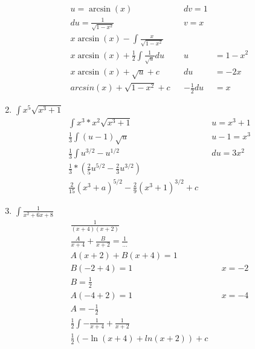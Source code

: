 \documentclass[11pt]{article}
\begin{document}
\begin{enumerate}
        \begin{align*}
            \label{q:6}
            u = \arcsin(x) && dv = 1 \\
            du = \frac{1}{\sqrt{1 - x^2}} && v = x \\
            x\arcsin(x) - \int \frac{x}{\sqrt{1 - x^2}} \\
            x\arcsin(x) + \frac{1}{2}\int\frac{1}{\sqrt{u}}du && u &= 1 - x^2 \\
            x\arcsin(x) + \sqrt{u} + c&& du &= -2x \\
            arcsin(x) + \sqrt{1-x^2} + c&& -\frac{1}{2}du &= x
        \end{align*}
        \item $\int x^5\sqrt{x^3 +1}$
        \begin{align*}
            \label{q:7}
            \int x^3 * x^2\sqrt{x^3 + 1}&& u = x^3 + 1 \\
            \frac{1}{3}\int (u - 1)\sqrt{u}&& u - 1 = x^3 \\
            \frac{1}{3} \int u^{3/2} - u^{1/2}&& du = 3x^2 \\
            \frac{1}{3} * (\frac{2}{5} u^{5/2} - \frac{2}{3}u^{3/2}) \\
            \frac{2}{15}(x^3 + a)^{5/2} - \frac{2}{9}(x^3 + 1)^{3/2} + c
        \end{align*}
        \item $\int \frac{1}{x^2 + 6x + 8}$
        \begin{align*}
            \label{q:8}
            \frac{1}{(x+4)(x+2)} \\
            \frac{A}{x+4} + \frac{B}{x+2} = \frac{1}{...} \\
            A(x+2) + B(x+4) = 1  \\
            B(-2 +4) = 1 && x = -2 \\
            B = \frac{1}{2} \\
            A (-4 + 2)  = 1 && x = -4 \\
            A = -\frac{1}{2} \\
            \frac{1}{2} \int -\frac{1}{x+4} + \frac{1}{x+2} \\
            \frac{1}{2} (- \ln(x+4) + ln(x+2)) + c
        \end{align*}
    \end{enumerate}
\end{document}
